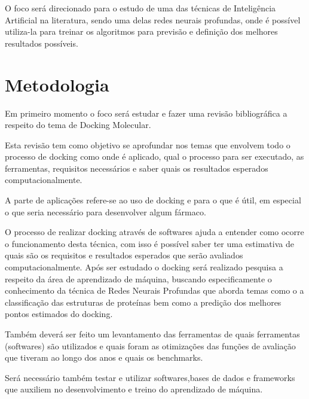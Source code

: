 \documentclass[tcc, capa]{texucpel}
\begin{document}
O foco será direcionado para o estudo de uma das técnicas de Inteligência Artificial na literatura, sendo uma delas redes neurais profundas, onde é possível utiliza-la para treinar os algoritmos para previsão e definição dos melhores resultados possíveis. 


\chapter{Metodologia}

Em primeiro momento o foco será estudar e fazer uma revisão bibliográfica a respeito do tema de Docking Molecular.

Esta revisão tem como objetivo se aprofundar nos temas que envolvem todo o processo de docking como onde é aplicado, qual o processo para ser executado, as ferramentas, requisitos necessários  e saber quais os resultados esperados computacionalmente.

A parte de aplicações refere-se ao uso de docking e para o que é útil,  em especial o que seria necessário para desenvolver algum fármaco.

O processo de realizar docking através de softwares ajuda a entender como ocorre o funcionamento desta técnica, com isso é possível saber ter uma estimativa de quais são os requisitos e resultados esperados que serão avaliados computacionalmente.
Após ser estudado o docking será realizado pesquisa a respeito da área de aprendizado de máquina, buscando especificamente o conhecimento da técnica de Redes Neurais Profundas que aborda temas como o a classificação das estruturas de proteínas bem como a predição dos melhores pontos estimados do docking.

Também deverá ser feito um levantamento das ferramentas de quais ferramentas (softwares) são utilizados e quais foram as otimizações das funções de avaliação que tiveram ao longo dos anos e quais os benchmarks.

Será necessário também testar e utilizar softwares,bases de dados e  frameworks que auxiliem no desenvolvimento e treino do aprendizado de máquina.

\end{document}
